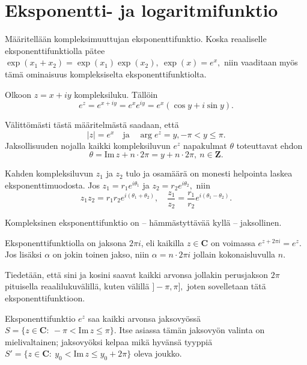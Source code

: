 \documentclass[a4paper, 12pt]{article}
\theoremstyle{remark}
\theoremstyle{definition}
\newcommand{\abs}[1]{\lvert#1\rvert}
\renewcommand{\Im}[1]{\textrm{Im}\, #1}
\begin{document}
\section{Eksponentti- ja logaritmifunktio}
Määritellään kompleksimuuttujan eksponenttifunktio. Koska reaaliselle eksponenttifunktiolla pätee $\exp(x_1+x_2)=\exp(x_1)\exp(x_2),\ \exp(x)=e^x,$ niin vaaditaan myös tämä ominaisuus kompleksiselta eksponenttifunktiolta.

\begin{maar} Olkoon $z=x+iy$ kompleksiluku. Tällöin
$$
e^{z}=e^{x+iy}=e^xe^{iy}=e^x(\cos y + i\sin y).
$$
\end{maar}

Välittömästi tästä määritelmästä saadaan, että
$$
\abs{z}=e^x\quad\text{ja}\quad \arg e^z=y, -\pi<y\leq \pi.
$$
Jaksollisuuden nojalla kaikki kompleksiluvun $e^z$ napakulmat $\theta$ toteuttavat ehdon
$$
\theta=\Im z+n\cdot2\pi=y+n\cdot 2\pi,\ n\in\mathbf{Z}.	
$$

Kahden kompleksiluvun $z_1$ ja $z_2$ tulo ja osamäärä on monesti helpointa laskea eksponenttimuodosta. Jos $z_1=r_1e^{i\theta_1}$ ja $z_2=r_2e^{i\theta_2},$ niin
$$
z_1z_2=r_1r_2e^{i(\theta_1+\theta_2)},\quad \frac{z_1}{z_2}=\frac{r_1}{r_2}e^{i(\theta_1-\theta_2)}.
$$

Kompleksinen eksponenttifunktio on -- hämmästyttävää kyllä -- jaksollinen.
\begin{lause} Eksponenttifunktiolla on jaksona $2\pi i$, eli kaikilla $z\in\mathbf{C}$ on voimassa
$\displaystyle e^{z+2\pi i}=e^z.$ Jos lisäksi $\alpha$ on jokin toinen jakso, niin $\alpha=n\cdot 2\pi i$ jollain kokonaisluvulla $n.$
\end{lause}

Tiedetään, että sini ja kosini saavat kaikki arvonsa jollakin perusjakson $2\pi$ pituisella reaalilukuvälillä, kuten välillä $]-\pi, \pi],$ joten sovelletaan tätä eksponenttifunktioon.

\begin{lause}
Eksponenttifunktio $e^z$ saa kaikki arvonsa jaksovyössä \newline$S=\{z\in\mathbf{C}:\ -\pi<\Im z\leq \pi\}.$ Itse asiassa tämän jaksovyön valinta on mielivaltainen; jaksovyöksi kelpaa mikä hyvänsä tyyppiä
$S'=\{z\in\mathbf{C}:\ y_0<\Im z\leq y_0+2\pi\}$ oleva joukko.
\end{lause}
\end{document}
